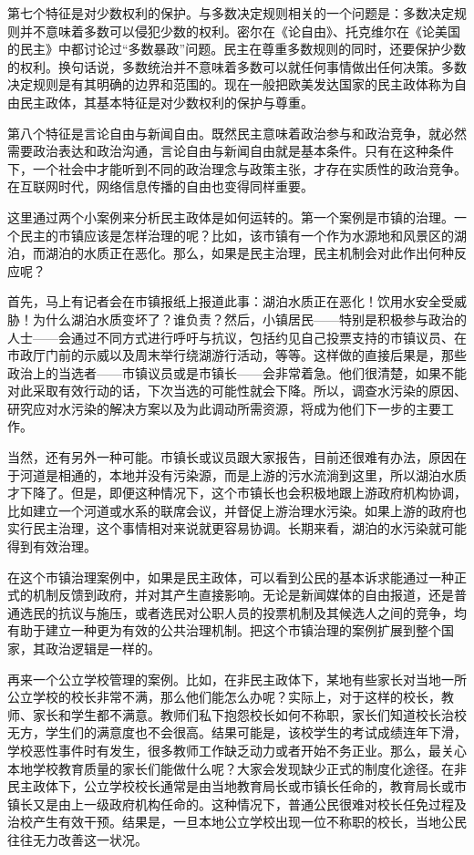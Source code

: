 第七个特征是对少数权利的保护。与多数决定规则相关的一个问题是：多数决定规则并不意味着多数可以侵犯少数的权利。密尔在《论自由》、托克维尔在《论美国的民主》中都讨论过“多数暴政”问题。民主在尊重多数规则的同时，还要保护少数的权利。换句话说，多数统治并不意味着多数可以就任何事情做出任何决策。多数决定规则是有其明确的边界和范围的。现在一般把欧美发达国家的民主政体称为自由民主政体，其基本特征是对少数权利的保护与尊重。

第八个特征是言论自由与新闻自由。既然民主意味着政治参与和政治竞争，就必然需要政治表达和政治沟通，言论自由与新闻自由就是基本条件。只有在这种条件下，一个社会中才能听到不同的政治理念与政策主张，才存在实质性的政治竞争。在互联网时代，网络信息传播的自由也变得同样重要。


这里通过两个小案例来分析民主政体是如何运转的。第一个案例是市镇的治理。一个民主的市镇应该是怎样治理的呢？比如，该市镇有一个作为水源地和风景区的湖泊，而湖泊的水质正在恶化。那么，如果是民主治理，民主机制会对此作出何种反应呢？

首先，马上有记者会在市镇报纸上报道此事：湖泊水质正在恶化！饮用水安全受威胁！为什么湖泊水质变坏了？谁负责？然后，小镇居民——特别是积极参与政治的人士——会通过不同方式进行呼吁与抗议，包括约见自己投票支持的市镇议员、在市政厅门前的示威以及周末举行绕湖游行活动，等等。这样做的直接后果是，那些政治上的当选者——市镇议员或是市镇长——会非常着急。他们很清楚，如果不能对此采取有效行动的话，下次当选的可能性就会下降。所以，调查水污染的原因、研究应对水污染的解决方案以及为此调动所需资源，将成为他们下一步的主要工作。

当然，还有另外一种可能。市镇长或议员跟大家报告，目前还很难有办法，原因在于河道是相通的，本地并没有污染源，而是上游的污水流淌到这里，所以湖泊水质才下降了。但是，即便这种情况下，这个市镇长也会积极地跟上游政府机构协调，比如建立一个河道或水系的联席会议，并督促上游治理水污染。如果上游的政府也实行民主治理，这个事情相对来说就更容易协调。长期来看，湖泊的水污染就可能得到有效治理。

在这个市镇治理案例中，如果是民主政体，可以看到公民的基本诉求能通过一种正式的机制反馈到政府，并对其产生直接影响。无论是新闻媒体的自由报道，还是普通选民的抗议与施压，或者选民对公职人员的投票机制及其候选人之间的竞争，均有助于建立一种更为有效的公共治理机制。把这个市镇治理的案例扩展到整个国家，其政治逻辑是一样的。

再来一个公立学校管理的案例。比如，在非民主政体下，某地有些家长对当地一所公立学校的校长非常不满，那么他们能怎么办呢？实际上，对于这样的校长，教师、家长和学生都不满意。教师们私下抱怨校长如何不称职，家长们知道校长治校无方，学生们的满意度也不会很高。结果可能是，该校学生的考试成绩连年下滑，学校恶性事件时有发生，很多教师工作缺乏动力或者开始不务正业。那么，最关心本地学校教育质量的家长们能做什么呢？大家会发现缺少正式的制度化途径。在非民主政体下，公立学校校长通常是由当地教育局长或市镇长任命的，教育局长或市镇长又是由上一级政府机构任命的。这种情况下，普通公民很难对校长任免过程及治校产生有效干预。结果是，一旦本地公立学校出现一位不称职的校长，当地公民往往无力改善这一状况。

